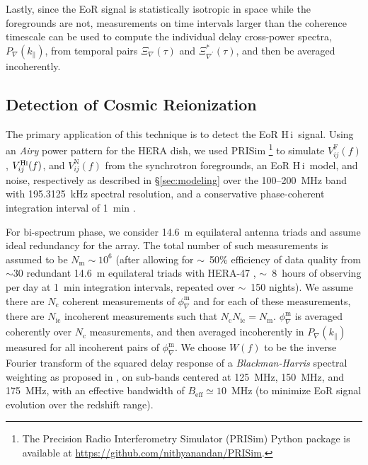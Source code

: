 \documentclass[
reprint,
superscriptaddress,
amsmath,
amssymb,
aps,
prd
]{revtex4-1}
\newcommand{\HI}{H\,{\sc i}}
\begin{document}
Lastly, since the EoR signal is statistically isotropic in space while the foregrounds are not, measurements on time intervals larger than the coherence timescale can be used to compute the individual delay cross-power spectra, $P_\nabla(k_\parallel)$, from temporal pairs $\Xi_\nabla(\tau)$ and $\Xi_{\nabla^\prime}^*(\tau)$, and then be averaged incoherently. 

\subsection{Detection of Cosmic Reionization}\label{sec:EoR-detection}

The primary application of this technique is to detect the EoR \HI\ signal. Using an {\it Airy} power pattern for the HERA dish, we used PRISim \footnote{The Precision Radio Interferometry Simulator (PRISim) Python package is available at \href{https://github.com/nithyanandan/PRISim}{https://github.com/nithyanandan/PRISim}.} to simulate $V_{ij}^\textrm{F}(f)$, $V_{ij}^\textrm{H{\sc i}}(f)$, and $V_{ij}^\textrm{N}(f)$ from the synchrotron foregrounds, an EoR \HI\ model, and noise, respectively as described in \S\ref{sec:modeling} over the 100--200~MHz band with 195.3125~kHz spectral resolution, and a conservative phase-coherent integration interval of 1~min \cite{car18}. 

For bi-spectrum phase, we consider 14.6~m equilateral antenna triads and assume ideal redundancy for the array. The total number of such measurements is assumed to be $N_\textrm{m} \sim 10^6$ (after allowing for $\sim$~50\% efficiency of data quality from $\sim 30$ redundant 14.6~m equilateral triads with HERA-47 , $\sim$~8~hours of observing per day at 1~min integration intervals, repeated over $\sim$~150 nights). We assume there are $N_\textrm{c}$ coherent measurements of $\phi_\nabla^\textrm{m}$ and for each of these measurements, there are $N_\textrm{ic}$ incoherent measurements such that $N_\textrm{c}N_\textrm{ic}=N_\textrm{m}$. $\phi_\nabla^\textrm{m}$ is averaged coherently over $N_\textrm{c}$ measurements, and then averaged incoherently in $P_\nabla(k_\parallel)$ measured for all incoherent pairs of $\phi_\nabla^\textrm{m}$. We choose $W(f)$ to be the inverse Fourier transform of the squared delay response of a {\it Blackman-Harris} spectral weighting \cite{har78} as proposed in \cite{thy16}, on sub-bands centered at 125~MHz, 150~MHz, and 175~MHz, with an effective bandwidth of $B_\textrm{eff}\simeq 10$~MHz (to minimize EoR signal evolution over the redshift range).
\end{document}
